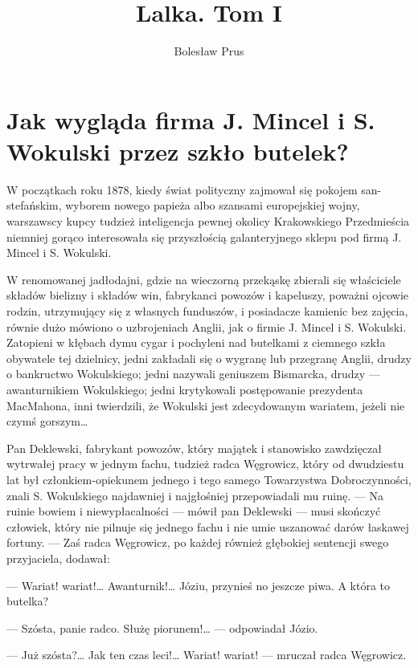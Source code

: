 \documentclass{book}
\author{\Huge{Bolesław Prus}}
\title{\Huge{Lalka. Tom I}}
\date{}
\begin{document}
\maketitle

\tableofcontents

\chapter{Jak wygląda firma J. Mincel i S. Wokulski przez szkło butelek?}

W początkach roku 1878, kiedy świat polityczny zajmował się pokojem san-stefańskim, wyborem nowego papieża albo szansami europejskiej wojny, warszawscy kupcy tudzież inteligencja pewnej okolicy Krakowskiego Przedmieścia niemniej gorąco interesowała się przyszłością galanteryjnego sklepu pod firmą J. Mincel i S. Wokulski.

W renomowanej jadłodajni, gdzie na wieczorną przekąskę zbierali się właściciele składów bielizny i składów win, fabrykanci powozów i kapeluszy, poważni ojcowie rodzin, utrzymujący się z własnych funduszów, i posiadacze kamienic bez zajęcia, równie dużo mówiono o uzbrojeniach Anglii, jak o firmie J. Mincel i S. Wokulski. Zatopieni w kłębach dymu cygar i pochyleni nad butelkami z ciemnego szkła obywatele tej dzielnicy, jedni zakładali się o wygranę lub przegranę Anglii, drudzy o bankructwo Wokulskiego; jedni nazywali geniuszem Bismarcka, drudzy — awanturnikiem Wokulskiego; jedni krytykowali postępowanie prezydenta MacMahona, inni twierdzili, że Wokulski jest zdecydowanym wariatem, jeżeli nie czymś gorszym…

Pan Deklewski, fabrykant powozów, który majątek i stanowisko zawdzięczał wytrwałej pracy w jednym fachu, tudzież radca Węgrowicz, który od dwudziestu lat był członkiem-opiekunem jednego i tego samego Towarzystwa Dobroczynności, znali S. Wokulskiego najdawniej i najgłośniej przepowiadali mu ruinę. — Na ruinie bowiem i niewypłacalności — mówił pan Deklewski — musi skończyć człowiek, który nie pilnuje się jednego fachu i nie umie uszanować darów łaskawej fortuny. — Zaś radca Węgrowicz, po każdej również głębokiej sentencji swego przyjaciela, dodawał:

— Wariat! wariat!… Awanturnik!… Józiu, przynieś no jeszcze piwa. A która to butelka?

— Szósta, panie radco. Służę piorunem!… — odpowiadał Józio.

— Już szósta?… Jak ten czas leci!… Wariat! wariat! — mruczał radca Węgrowicz.
\end{document}
